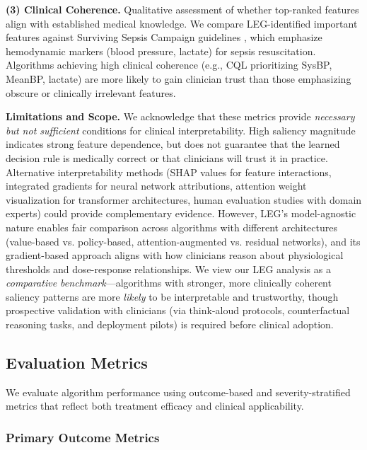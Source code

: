 \textbf{(3) Clinical Coherence.} Qualitative assessment of whether top-ranked features align with established medical knowledge. We compare LEG-identified important features against Surviving Sepsis Campaign guidelines \citep{rhodes2017ssc}, which emphasize hemodynamic markers (blood pressure, lactate) for sepsis resuscitation. Algorithms achieving high clinical coherence (e.g., CQL prioritizing SysBP, MeanBP, lactate) are more likely to gain clinician trust than those emphasizing obscure or clinically irrelevant features.

\textbf{Limitations and Scope.} We acknowledge that these metrics provide \textit{necessary but not sufficient} conditions for clinical interpretability. High saliency magnitude indicates strong feature dependence, but does not guarantee that the learned decision rule is medically correct or that clinicians will trust it in practice. Alternative interpretability methods (SHAP values for feature interactions, integrated gradients for neural network attributions, attention weight visualization for transformer architectures, human evaluation studies with domain experts) could provide complementary evidence. However, LEG's model-agnostic nature enables fair comparison across algorithms with different architectures (value-based vs. policy-based, attention-augmented vs. residual networks), and its gradient-based approach aligns with how clinicians reason about physiological thresholds and dose-response relationships. We view our LEG analysis as a \textit{comparative benchmark}---algorithms with stronger, more clinically coherent saliency patterns are more \textit{likely} to be interpretable and trustworthy, though prospective validation with clinicians (via think-aloud protocols, counterfactual reasoning tasks, and deployment pilots) is required before clinical adoption.

\subsection{Evaluation Metrics}\label{sec:methods:eval}

We evaluate algorithm performance using outcome-based and severity-stratified metrics that reflect both treatment efficacy and clinical applicability.

\subsubsection{Primary Outcome Metrics}

